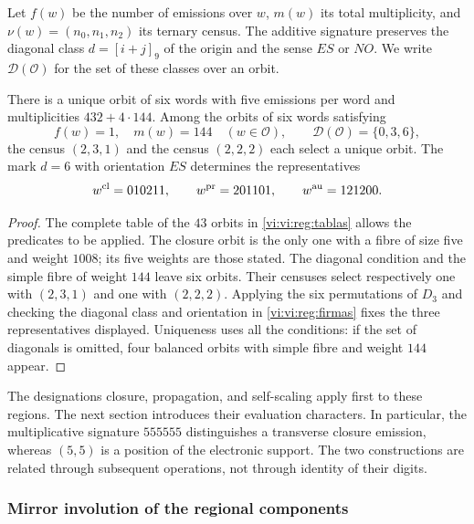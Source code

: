 Let \(f(w)\) be the number of emissions over \(w\), \(m(w)\)
its total multiplicity, and \(\nu(w)=(n_0,n_1,n_2)\) its ternary
census. The additive signature preserves the diagonal class
\(d=[i+j]_9\) of the origin and the sense \(ES\) or \(NO\).
We write \(\mathcal D(\mathcal O)\) for the set of these
classes over an orbit.

\begin{proposition}
\label{vi:vi:reg:seleccion}
There is a unique orbit of six words with five emissions per
word and multiplicities \(432+4\cdot144\). Among the orbits
of six words satisfying
\[
 f(w)=1,\quad m(w)=144\quad(w\in\mathcal O),\qquad
 \mathcal D(\mathcal O)=\{0,3,6\},
\]
the census \((2,3,1)\) and the census \((2,2,2)\) each select
a unique orbit. The mark \(d=6\) with orientation
\(ES\) determines the representatives
\[
 w^{\rm cl}=010211,\qquad w^{\rm pr}=201101,
 \qquad w^{\rm au}=121200.
\]
\end{proposition}
\begin{proof}
The complete table of the \(43\) orbits in
\ref{vi:vi:reg:tablas} allows the predicates to be applied. The closure
orbit is the only one with a fibre of size five and weight \(1008\);
its five weights are those stated. The diagonal condition and the
simple fibre of weight \(144\) leave six orbits. Their censuses
select respectively one with \((2,3,1)\) and one with
\((2,2,2)\). Applying the six permutations of \(D_3\) and
checking the diagonal class and orientation in
\eqref{vi:vi:reg:firmas} fixes the three representatives displayed.
Uniqueness uses all the conditions: if the set of
diagonals is omitted, four balanced orbits with simple fibre
and weight \(144\) appear.
\end{proof}

The designations closure, propagation, and self-scaling apply
first to these regions. The next section introduces their
evaluation characters. In particular, the multiplicative signature
\(555555\) distinguishes a transverse closure emission, whereas
\((5,5)\) is a position of the electronic support. The two
constructions are related through subsequent operations, not
through identity of their digits.

\subsubsection{Mirror involution of the regional components}
\label{vi:mono-ampl:regiones}

